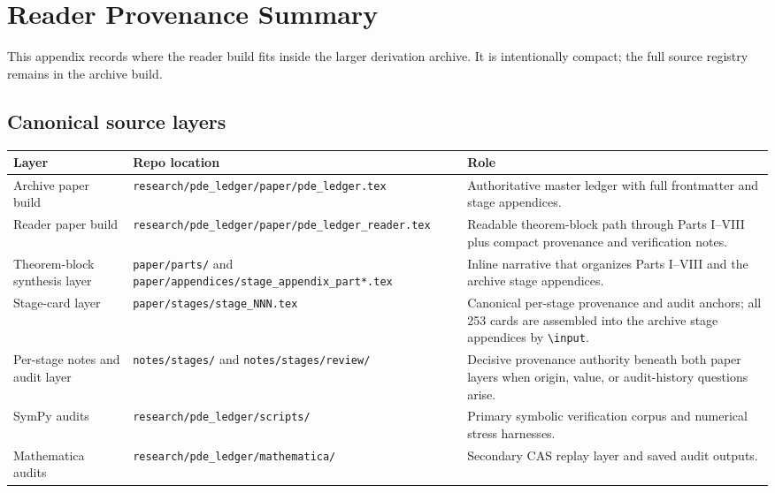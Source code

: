 \chapter{Reader Provenance Summary}
\label{app:reader-provenance-summary}

\def\ReaderPath#1{\begingroup\footnotesize\nolinkurl{#1}\endgroup}

This appendix records where the reader build fits inside the larger derivation
archive. It is intentionally compact; the full source registry remains in the
archive build.

\section{Canonical source layers}

\begin{longtable}{L{0.26\textwidth}L{0.25\textwidth}L{0.39\textwidth}}
\toprule
Layer & Repo location & Role \\
\midrule
\endhead
Archive paper build & \ReaderPath{research/pde_ledger/paper/pde_ledger.tex} &
Authoritative master ledger with full frontmatter and stage appendices. \\
\addlinespace
Reader paper build & \ReaderPath{research/pde_ledger/paper/pde_ledger_reader.tex}
& Readable theorem-block path through Parts I--VIII plus compact provenance and
verification notes. \\
\addlinespace
Theorem-block synthesis layer & \ReaderPath{paper/parts/} and
\ReaderPath{paper/appendices/stage_appendix_part*.tex} & Inline narrative that
organizes Parts I--VIII and the archive stage appendices. \\
\addlinespace
Stage-card layer & \ReaderPath{paper/stages/stage_NNN.tex} & Canonical
per-stage provenance and audit anchors; all 253 cards are assembled into the
archive stage appendices by \texttt{\textbackslash input}. \\
\addlinespace
Per-stage notes and audit layer & \ReaderPath{notes/stages/} and
\ReaderPath{notes/stages/review/} & Decisive provenance authority beneath both
paper layers when origin, value, or audit-history questions arise. \\
\addlinespace
SymPy audits & \ReaderPath{research/pde_ledger/scripts/} & Primary symbolic
verification corpus and numerical stress harnesses. \\
\addlinespace
Mathematica audits & \ReaderPath{research/pde_ledger/mathematica/}
& Secondary CAS replay layer and saved audit outputs. \\
\bottomrule
\end{longtable}

